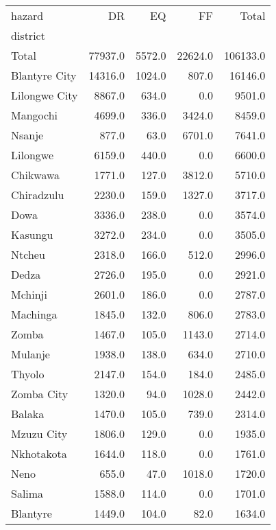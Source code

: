 \begin{tabular}{lrrrr}
\toprule
hazard &       DR &      EQ &       FF &     Total \\
district      &          &         &          &           \\
\midrule
Total         &  77937.0 &  5572.0 &  22624.0 &  106133.0 \\
Blantyre City &  14316.0 &  1024.0 &    807.0 &   16146.0 \\
Lilongwe City &   8867.0 &   634.0 &      0.0 &    9501.0 \\
Mangochi      &   4699.0 &   336.0 &   3424.0 &    8459.0 \\
Nsanje        &    877.0 &    63.0 &   6701.0 &    7641.0 \\
Lilongwe      &   6159.0 &   440.0 &      0.0 &    6600.0 \\
Chikwawa      &   1771.0 &   127.0 &   3812.0 &    5710.0 \\
Chiradzulu    &   2230.0 &   159.0 &   1327.0 &    3717.0 \\
Dowa          &   3336.0 &   238.0 &      0.0 &    3574.0 \\
Kasungu       &   3272.0 &   234.0 &      0.0 &    3505.0 \\
Ntcheu        &   2318.0 &   166.0 &    512.0 &    2996.0 \\
Dedza         &   2726.0 &   195.0 &      0.0 &    2921.0 \\
Mchinji       &   2601.0 &   186.0 &      0.0 &    2787.0 \\
Machinga      &   1845.0 &   132.0 &    806.0 &    2783.0 \\
Zomba         &   1467.0 &   105.0 &   1143.0 &    2714.0 \\
Mulanje       &   1938.0 &   138.0 &    634.0 &    2710.0 \\
Thyolo        &   2147.0 &   154.0 &    184.0 &    2485.0 \\
Zomba City    &   1320.0 &    94.0 &   1028.0 &    2442.0 \\
Balaka        &   1470.0 &   105.0 &    739.0 &    2314.0 \\
Mzuzu City    &   1806.0 &   129.0 &      0.0 &    1935.0 \\
Nkhotakota    &   1644.0 &   118.0 &      0.0 &    1761.0 \\
Neno          &    655.0 &    47.0 &   1018.0 &    1720.0 \\
Salima        &   1588.0 &   114.0 &      0.0 &    1701.0 \\
Blantyre      &   1449.0 &   104.0 &     82.0 &    1634.0 \\

\end{tabular}
